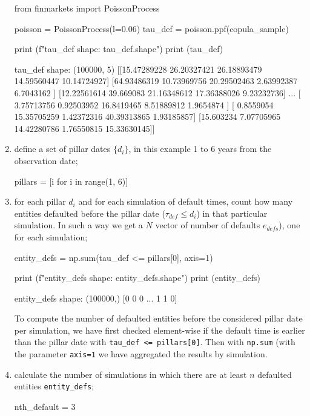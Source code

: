 \documentclass[]{article}
\begin{document}
\begin{enumerate}
\begin{ipython}
from finmarkets import PoissonProcess

poisson = PoissonProcess(l=0.06)
tau_def = poisson.ppf(copula_sample)

print (f"tau_def shape: {tau_def.shape}")
print (tau_def)
\end{ipython}
\begin{ioutput}
tau_def shape: (100000, 5)
[[15.47289228 26.20327421 26.18893479 14.59560447 10.14724927]
[64.93486319 10.73969756 20.29502463  2.63992387  6.7043162 ]
[12.22561614 39.669083   21.16348612 17.36388026  9.23232736]
...
[ 3.75713756  0.92503952 16.8419465   8.51889812  1.9654874 ]
[ 0.8559054  15.35705259  1.42372316 40.39313865  1.93185857]
[15.603234    7.07705965 14.42280786  1.76550815 15.33630145]]
\end{ioutput}

\item define a set of pillar dates $\{d_i\}$, in this example 1 to 6 years from the observation date;
\begin{ipython}
pillars = [i for i in range(1, 6)]
\end{ipython}

\item for each pillar $d_i$ and for each simulation of default times, count how many entities defaulted before the pillar date ($\tau_{def}\leq d_i$) in that particular simulation. In such a way we get a $N$ vector of number of defaults $e_{defs}$), one for each simulation;
\begin{ipython}
entity_defs = np.sum(tau_def <= pillars[0], axis=1)

print (f"entity_defs shape: {entity_defs.shape}")
print (entity_defs)
\end{ipython}
\begin{ioutput}
entity_defs shape: (100000,)
[0 0 0 ... 1 1 0]
\end{ioutput}
To compute the number of defaulted entities before the considered pillar date per simulation, we have first checked element-wise if the default time is earlier than the pillar date with \texttt{tau\_def <= pillars[0]}. Then with \texttt{np.sum} (with the parameter \texttt{axis=1} we have aggregated the results by simulation.
\item calculate the number of simulations in which there are at least $n$ defaulted entities \texttt{entity\_defs};
\begin{ipython}
nth_default = 3


\end{ipython}
\end{enumerate}
\end{document}
